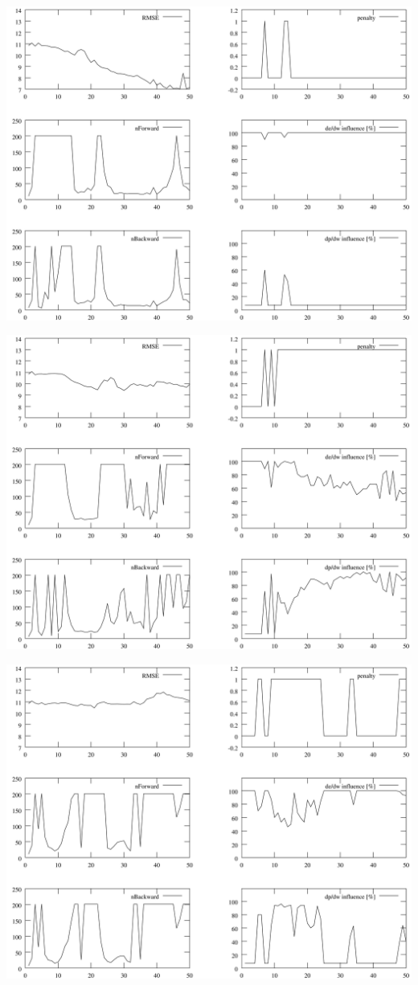 \documentclass{beamer}
\begin{document}
\begin{frame}
	\includegraphics[scale=0.065]{img/params_set3}
\end{frame}
\begin{frame}
	\includegraphics[scale=0.065]{img/params_set4}
\end{frame}
\begin{frame}
	\includegraphics[scale=0.065]{img/params_set5}
\end{frame}
\end{document}
